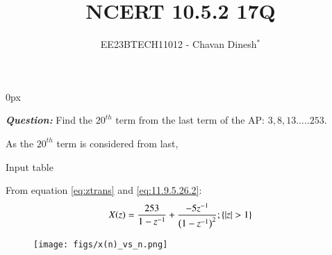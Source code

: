 \documentclass[journal,12pt,twocolumn]{IEEEtran}
\theoremstyle{remark}
\begin{document}
\parindent 0px

\vspace{3cm}

\title{NCERT 10.5.2 17Q}
\author{EE23BTECH11012 - Chavan Dinesh$^{*}$%
}
\maketitle
\newpage
\bigskip

\renewcommand{\thefigure}{\arabic{figure}}
\renewcommand{\thetable}{\arabic{table}}
\large\textbf{\textsl{Question:}}
Find the $20^{th}$ term from the last term of the AP: $3,8,13.....253$.

\solution

As the $20^{th}$ term is considered from last, 

\begin{table}[htbp]
    \centering
    
    \caption{Input table}
    \label{tab:parameter_table.10.5.2.17}
\end{table}

From equation \eqref{eq:ztrans} and \eqref{eq:11.9.5.26.2}:
\begin{align}
 X(z) =\frac{253}{1-z^{-1}}+ \frac{-5z^{-1}}{\brak{1-z^{-1}}^2};\cbrak{|z|>1}
\end{align}

\begin{figure}[ht]
    \centering
    \texttt{[image: figs/x(n)\_vs\_n.png]}
    \caption{}
    \label{fig:graph1}
\end{figure}


\end{document}
